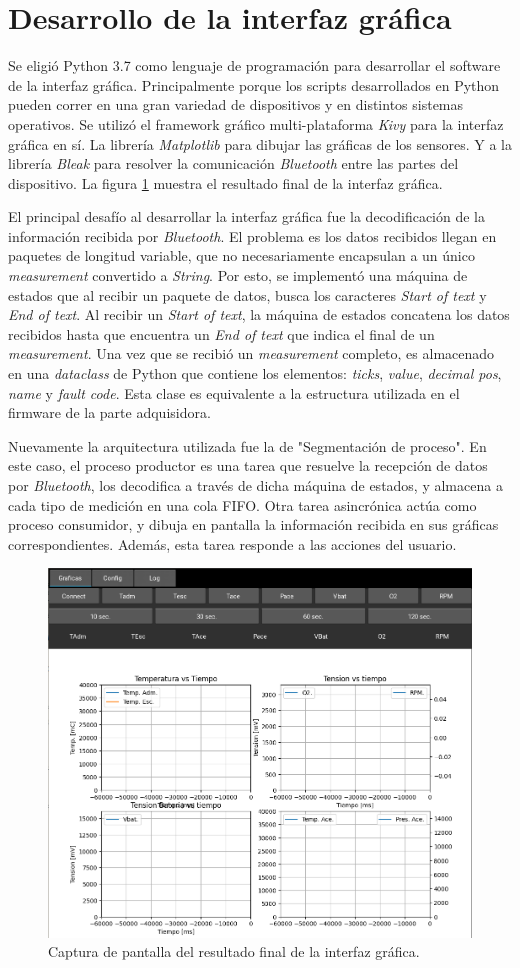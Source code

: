 \section{Desarrollo de la interfaz gráfica}

Se eligió Python 3.7 como lenguaje de programación para desarrollar el software de la interfaz gráfica. Principalmente porque los scripts desarrollados en Python pueden correr en una gran variedad de dispositivos y en distintos sistemas operativos. Se utilizó el framework gráfico multi-plataforma \textit{Kivy} para la interfaz gráfica en sí. La librería \textit{Matplotlib} para dibujar las gráficas de los sensores. Y a la librería \textit{Bleak} para resolver la comunicación \textit{Bluetooth} entre las partes del dispositivo. La figura \ref{fig:gui} muestra el resultado final de la interfaz gráfica.

El principal desafío al desarrollar la interfaz gráfica fue la decodificación de la información recibida por \textit{Bluetooth}. El problema es los datos recibidos llegan en paquetes de longitud variable, que no necesariamente encapsulan a un único \textit{measurement} convertido a \textit{String}. Por esto, se implementó una máquina de estados que al recibir un paquete de datos, busca los caracteres \textit{Start of text} y \textit{End of text}. Al recibir un \textit{Start of text}, la máquina de estados concatena los datos recibidos hasta que encuentra un \textit{End of text} que indica el final de un \textit{measurement}. Una vez que se recibió un \textit{measurement} completo, es almacenado en una \textit{dataclass} de Python que contiene los elementos: \textit{ticks}, \textit{value}, \textit{decimal pos}, \textit{name} y \textit{fault code}. Esta clase es equivalente a la estructura utilizada en el firmware de la parte adquisidora.

Nuevamente la arquitectura utilizada fue la de "Segmentación de proceso". En este caso, el proceso productor es una tarea que resuelve la recepción de datos por \textit{Bluetooth}, los decodifica a través de dicha máquina de estados, y almacena a cada tipo de medición en una cola FIFO. Otra tarea asincrónica actúa como proceso consumidor, y dibuja en pantalla la información recibida en sus gráficas correspondientes. Además, esta tarea responde a las acciones del usuario.

\begin{figure}[htpb]
\centering
\includegraphics[width=.9\textwidth]{./Figures/gui.png}
\caption{Captura de pantalla del resultado final de la interfaz gráfica.}
\label{fig:gui}
\end{figure}

